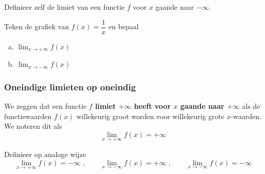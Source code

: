 \documentclass[12pt]{article}
\newenvironment{definitie}
{
  \vspace{0.4cm}
  \begin{mdframed}[nobreak=true,frametitle={Definitie}]
  }{%
  \end{mdframed}
}
\begin{document}
\begin{oefening}
  Definieer zelf de limiet van een functie $f$ voor $x$ gaande naar $-\infty$.
\end{oefening}

\begin{oefening}
  Teken de grafiek van $f(x)=\dfrac{1}{x}$ en bepaal
  \begin{enumerate}[(a)]
  \itemsep.5em
  \item $\displaystyle \lim_{x\to +\infty} f(x)$
  \item $\displaystyle \lim_{x\to -\infty} f(x)$
  \end{enumerate}
\end{oefening}

\begin{theorie}

\subsubsection*{Oneindige limieten op oneindig}

\begin{definitie}
  We zeggen dat een functie  {\bf $f$ limiet $+\infty$ heeft voor $x$ gaande naar $+\infty$} als de functiewaarden $f(x)$ willekeurig groot worden voor willekeurig grote $x$-waarden. We noteren dit als
  $$\lim_{x\to +\infty} f(x)=+\infty$$
\end{definitie}

\end{theorie}

\begin{oefening}
  Definieer op analoge wijze
  $$\lim_{x\to +\infty} f(x)=-\infty\;,\qquad\lim_{x\to -\infty} f(x)=+\infty\;,\qquad\lim_{x\to -\infty} f(x)=-\infty$$
\end{oefening}
\end{document}
